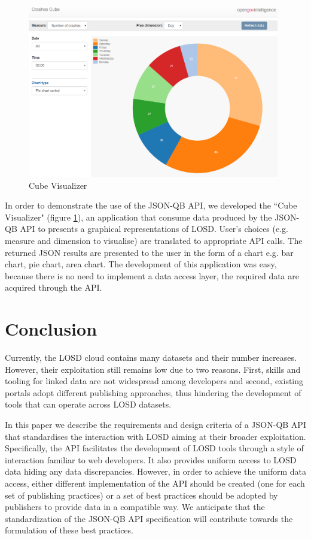 \documentclass{llncs}
\begin{document}
\begin{figure}[h!]
  \includegraphics[width=110mm]{images/cubeVisualizer.png}
\caption{Cube Visualizer}
\label{fig:cubeVisualizer}
\end{figure}

In order to demonstrate the use of the JSON-QB API, we developed the ``Cube Visualizer" (figure \ref{fig:cubeVisualizer}), an application that consume data produced by the JSON-QB API to presents a graphical representations of LOSD. User’s choices (e.g. measure and dimension to visualise) are translated to appropriate API calls. The returned JSON results are presented to the user in the form of a chart e.g. bar chart, pie chart, area chart. The development of this application was easy, because there is no need to implement a data access layer, the required data are acquired through the API.

\section{Conclusion}\label{sec:conclusion}

Currently, the LOSD cloud contains many datasets and their number increases. However, their exploitation still remains low due to two reasons. First, skills and tooling for linked data are not widespread among developers and second, existing portals adopt different publishing approaches, thus hindering the development of tools that can operate across LOSD datasets.

In this paper we describe the requirements and design criteria of a JSON-QB API that standardises the interaction with LOSD aiming at their broader exploitation. Specifically, the API facilitates the development of LOSD tools through a style of interaction familiar to web developers. It also provides uniform access to LOSD data hiding any data discrepancies. However, in order to achieve the uniform data access, either different implementation of the API should be created (one for each set of publishing practices) or a set of best practices should be adopted by  publishers to provide data in a compatible way. We anticipate that the standardization of the JSON-QB API specification will contribute towards the formulation of these best practices. 
\end{document}
